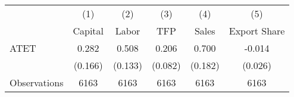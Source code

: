 \begin{tabular}{l*{5}{c}}
\hline\hline
                    &\multicolumn{1}{c}{(1)}&\multicolumn{1}{c}{(2)}&\multicolumn{1}{c}{(3)}&\multicolumn{1}{c}{(4)}&\multicolumn{1}{c}{(5)}\\
                    &\multicolumn{1}{c}{Capital}&\multicolumn{1}{c}{Labor}&\multicolumn{1}{c}{TFP}&\multicolumn{1}{c}{Sales}&\multicolumn{1}{c}{Export Share}\\
\hline
ATET                &       0.282&       0.508&       0.206&       0.700&      -0.014\\
                    &     (0.166)&     (0.133)&     (0.082)&     (0.182)&     (0.026)\\
\hline
Observations        &        6163&        6163&        6163&        6163&        6163\\
\hline\hline
\end{tabular}
